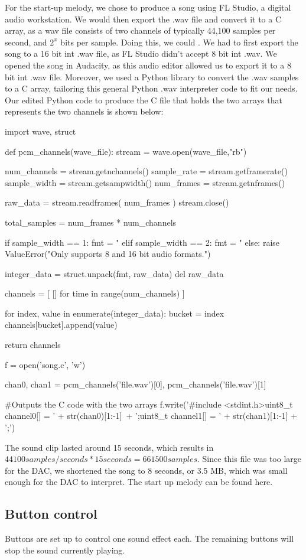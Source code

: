 For the start-up melody, we chose to produce a song using FL Studio, a digital audio workstation. We would then export the .wav file and convert it to a C array, as a wav file consists of two channels of typically 44,100 samples per second, and $2^x$ bits per sample. Doing this, we could . We had to first export the song to a 16 bit int .wav file, as FL Studio didn't accept 8 bit int .wav. We opened the song in Audacity, as this audio editor allowed us to export it to a 8 bit int .wav file. Moreover, we used a Python library to convert the .wav samples to a C array, tailoring this general Python .wav interpreter code \cite{wav} to fit our needs. Our edited Python code to produce the C file that holds the two arrays that represents the two channels is shown below:
\\[1cm]
\begin{code}
import wave, struct

def pcm_channels(wave_file):
    stream = wave.open(wave_file,"rb")

    num_channels = stream.getnchannels()
    sample_rate = stream.getframerate()
    sample_width = stream.getsampwidth()
    num_frames = stream.getnframes()

    raw_data = stream.readframes( num_frames )
    stream.close()

    total_samples = num_frames * num_channels

    if sample_width == 1: 
        fmt = "%
    elif sample_width == 2:
        fmt = "%
    else:
        raise ValueError("Only supports 8 and 16 bit audio formats.")

    integer_data = struct.unpack(fmt, raw_data)
    del raw_data

    channels = [ [] for time in range(num_channels) ]

    for index, value in enumerate(integer_data):
        bucket = index %
        channels[bucket].append(value)

    return channels

f = open('song.c', 'w')

chan0, chan1 = pcm_channels('file.wav')[0], pcm_channels('file.wav')[1]

#Outputs the C code with the two arrays
f.write('#include <stdint.h>\n\nconst uint8_t channel0[] = {' + str(chan0)[1:-1]\
 + '};\n\nconst uint8_t channel1[] = {' + str(chan1)[1:-1] + '};')

\end{code}

\newpage

The sound clip lasted around 15 seconds, which results in $44100 samples/seconds * 15 seconds = 661500 samples$. 
Since this file was too large for the DAC, we shortened the song to 8 seconds, or 3.5 MB, which was small enough for the DAC to interpret.
The start up melody can be found here. \cite{song}

\subsection{Button control}

Buttons are set up to control one sound effect each. The remaining buttons will stop the sound currently playing.
